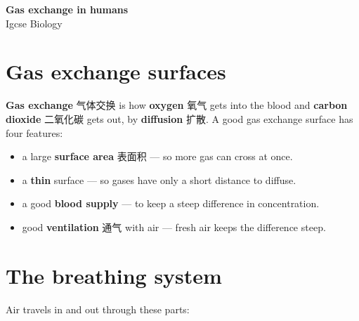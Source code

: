 \documentclass[11pt]{article}
\begin{document}
\begin{center}
  {\LARGE\bfseries Gas exchange in humans}\\[0.35em]
  {\large Igcse Biology}
\end{center}
\vspace{0.6em}

\section*{Gas exchange surfaces}

\textbf{Gas exchange} 气体交换 is how \textbf{oxygen} 氧气 gets into the blood and \textbf{carbon dioxide} 二氧化碳 gets out, by \textbf{diffusion} 扩散. A good gas exchange surface has four features:

\begin{itemize}
\item a large \textbf{surface area} 表面积 — so more gas can cross at once.

\item a \textbf{thin} surface — so gases have only a short distance to diffuse.

\item a good \textbf{blood supply} — to keep a steep difference in concentration.

\item good \textbf{ventilation} 通气 with air — fresh air keeps the difference steep.

\end{itemize}

\section*{The breathing system}

Air travels in and out through these parts:

\begin{center}
\end{center}
\end{document}
